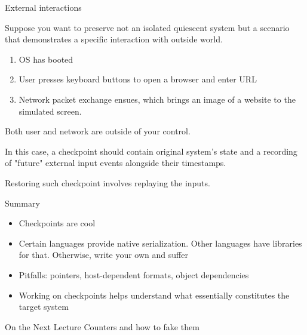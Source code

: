 \begin{frame}{External interactions}

Suppose you want to preserve not an isolated quiescent system but a scenario that demonstrates a specific interaction with outside world.

\begin{enumerate}
    \item OS has booted
    \item User presses keyboard buttons to open a browser and enter URL
    \item Network packet exchange ensues, which brings an image of a website to the simulated screen.
\end{enumerate}

Both user and network are outside of your control.

In this case, a checkpoint should contain original system's state and a recording of "future" external input events alongside their timestamps.

Restoring such checkpoint involves replaying the inputs.

\end{frame}


\begin{frame}{Summary}
\begin{itemize}
\item Checkpoints are cool
\item Certain languages provide native serialization. Other languages have libraries for that. Otherwise, write your own and suffer
\item Pitfalls: pointers, host-dependent formats, object dependencies
\item Working on checkpoints helps understand what essentially constitutes the target system
\end{itemize}
\end{frame}



\begin{frame}{On the Next Lecture}
Counters and how to fake them
\end{frame}

\finalslide


